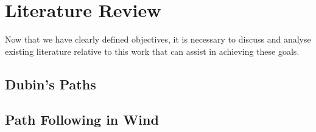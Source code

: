 
\chapter{Literature Review}
\label{litrev}

\ifpdf
    \graphicspath{{Chapter2/Figs/Raster/}{Chapter2/Figs/PDF/}{Chapter2/Figs/}}
\else
    \graphicspath{{Chapter2/Figs/Vector/}{Chapter2/Figs/}}
\fi

Now that we have clearly defined objectives, it is necessary to discuss and analyse existing literature relative to this work that can assist in achieving these goals. 

\section{Dubin's Paths}
\label{litrev:dubins}


\section{Path Following in Wind}
\label{litrev:path}
